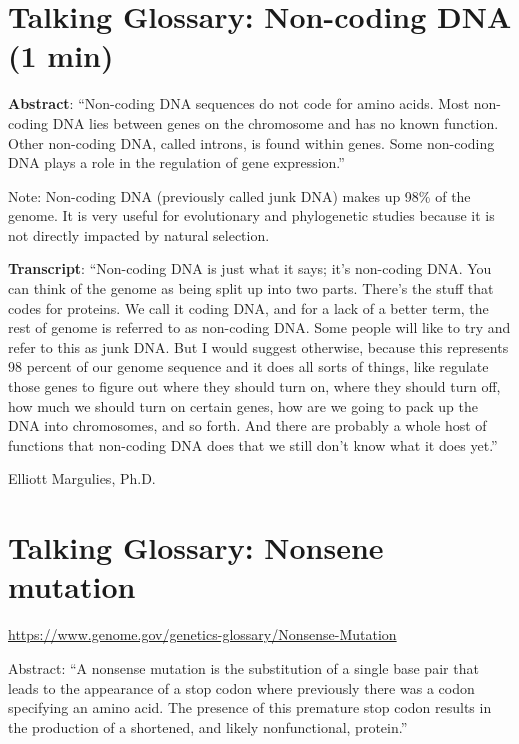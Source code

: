 \documentclass[
]{book}
\begin{document}
\hypertarget{talking-glossary-non-coding-dna-1-min}{%
\section{Talking Glossary: Non-coding DNA (1 min)}\label{talking-glossary-non-coding-dna-1-min}}

\textbf{Abstract}: ``Non-coding DNA sequences do not code for amino acids. Most non-coding DNA lies between genes on the chromosome and has no known function. Other non-coding DNA, called introns, is found within genes. Some non-coding DNA plays a role in the regulation of gene expression.''

Note: Non-coding DNA (previously called junk DNA) makes up 98\% of the genome. It is very useful for evolutionary and phylogenetic studies because it is not directly impacted by natural selection.

\textbf{Transcript}: ``Non-coding DNA is just what it says; it's non-coding DNA. You can think of the genome as being split up into two parts. There's the stuff that codes for proteins. We call it coding DNA, and for a lack of a better term, the rest of genome is referred to as non-coding DNA. Some people will like to try and refer to this as junk DNA. But I would suggest otherwise, because this represents 98 percent of our genome sequence and it does all sorts of things, like regulate those genes to figure out where they should turn on, where they should turn off, how much we should turn on certain genes, how are we going to pack up the DNA into chromosomes, and so forth. And there are probably a whole host of functions that non-coding DNA does that we still don't know what it does yet.''

Elliott Margulies, Ph.D.

\hypertarget{talking-glossary-nonsene-mutation}{%
\section{Talking Glossary: Nonsene mutation}\label{talking-glossary-nonsene-mutation}}

\url{https://www.genome.gov/genetics-glossary/Nonsense-Mutation}

Abstract: ``A nonsense mutation is the substitution of a single base pair that leads to the appearance of a stop codon where previously there was a codon specifying an amino acid. The presence of this premature stop codon results in the production of a shortened, and likely nonfunctional, protein.''
\end{document}
